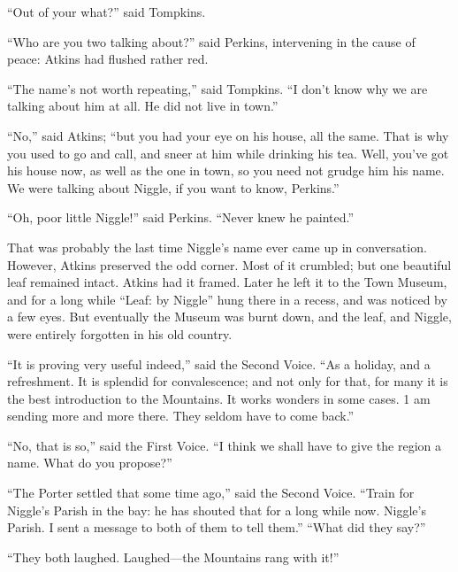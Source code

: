 \documentclass[english]{scrartcl}
\begin{document}
“Out of your what?” said Tompkins.

“Who are you two talking about?” said Perkins, intervening in the cause of peace: Atkins had flushed rather red.

“The name’s not worth repeating,” said Tompkins. “I don’t know why we are talking about him at all. He did not live in town.”

“No,” said Atkins; “but you had your eye on his house, all the same. That is why you used to go and call, and sneer at him while drinking his tea. Well, you’ve got his house now, as well as the one in town, so you need not grudge him his name. We were talking about Niggle, if you want to know, Perkins.”

“Oh, poor little Niggle!” said Perkins. “Never knew he painted.”

That was probably the last time Niggle’s name ever came up in conversation. However, Atkins preserved the odd corner. Most of it crumbled; but one beautiful leaf remained intact. Atkins had it framed. Later he left it to the Town Museum, and for a long while “Leaf: by Niggle” hung there in a recess, and was noticed by a few eyes. But eventually the Museum was burnt down, and the leaf, and Niggle, were entirely forgotten in his old country.

“It is proving very useful indeed,” said the Second Voice. “As a holiday, and a refreshment. It is splendid for convalescence; and not only for that, for many it is the best introduction to the Mountains. It works wonders in some cases. 1 am sending more and more there. They seldom have to come back.”

“No, that is so,” said the First Voice. “I think we shall have to give the region a name. What do you propose?”

“The Porter settled that some time ago,” said the Second Voice. “Train for Niggle’s Parish in the bay: he has shouted that for a long while now. Niggle’s Parish. I sent a message to both of them to tell them.” “What did they say?”

“They both laughed. Laughed—the Mountains rang with it!”
\end{document}
